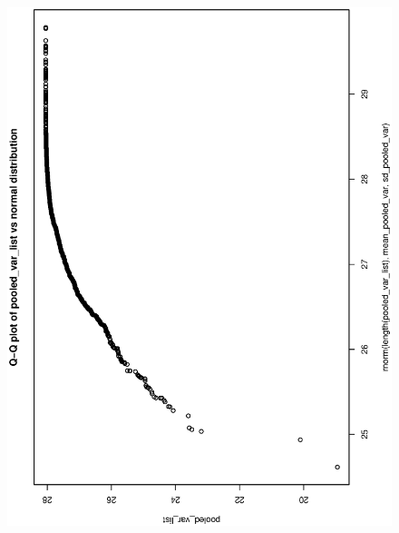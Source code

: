 \documentclass[a4paper,10pt]{article}
\begin{document}
\begin{figure}
\includegraphics[angle=-90, width=1\textwidth]{figures/math650_hw4_pooled_var_qqplot.eps}
\caption{}\label{f6}
\end{figure}
\end{document}
